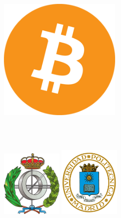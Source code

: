 
\begin{titlepage}

\begin{addmargin}[-1cm]{-3cm}
\begin{center}
\large

\hfill
\vfill

\begingroup
\color{Maroon}\spacedallcaps{\myTitle} \\ \bigskip %
\endgroup

\spacedlowsmallcaps{\myName} \\ %
\spacedlowsmallcaps{\myProf} \\
\spacedlowsmallcaps{\myOtherProf} 


\vfill

\includegraphics[width=6cm]{gfx/bitcoin-logo} \\ \medskip %

\myDegree \\
\myUni \\ \bigskip

\myTime

\end{center}

\vfill

\includegraphics[width=3cm]{gfx/logo_etsiinf}
\hfill
\includegraphics[width=3cm]{gfx/upm-logo}

\end{addmargin}
\end{titlepage}
